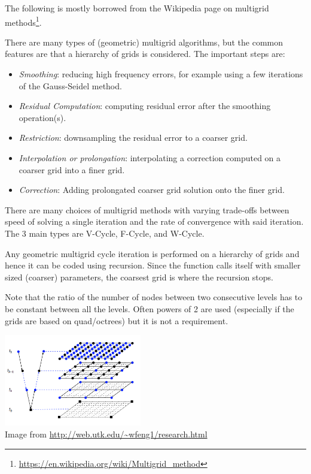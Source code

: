 
The following is mostly borrowed from the Wikipedia page on multigrid methods\footnote{\url{https://en.wikipedia.org/wiki/Multigrid_method}}.

There are many types of (geometric) multigrid algorithms, but the common features are that a hierarchy of grids is considered. The important steps are:

\begin{itemize}
\item {\sl Smoothing}: reducing high frequency errors, for example using a few iterations of the Gauss-Seidel method.
\item {\sl Residual Computation}: computing residual error after the smoothing operation(s).
\item {\sl Restriction}: downsampling the residual error to a coarser grid.
\item {\sl Interpolation or prolongation}: interpolating a correction computed on a coarser grid into a finer grid.
\item {\sl Correction}: Adding prolongated coarser grid solution onto the finer grid.
\end{itemize}

There are many choices of multigrid methods with varying trade-offs between speed of solving a single iteration and the rate of convergence with said iteration. The 3 main types are V-Cycle, F-Cycle, and W-Cycle.

Any geometric multigrid cycle iteration is performed on a hierarchy of grids and hence it can be coded using recursion. Since the function calls itself with smaller sized (coarser) parameters, the coarsest grid is where the recursion stops.

Note that the ratio of the number of nodes between two consecutive levels has to be constant between all the levels. Often powers of 2 are used (especially if the grids are based on quad/octrees) but it is not a requirement. 



\begin{center}
\includegraphics[width=6cm]{images/multigrid/mggrid}\\
{\scriptsize Image from \url{http://web.utk.edu/~wfeng1/research.html}}
\end{center}



